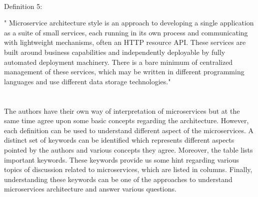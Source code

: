\\
\begin{shaded}Definition 5: \cite{Fowler:2014aa}\end{shaded}
" Microservice architecture style is an approach to developing a single application as a suite of small services, each running in its own process and communicating with lightweight mechanisms, often an HTTP resource API. These services are built around business capabilities and independently deployable by fully automated deployment machinery. There is a bare minimum of centralized management of these services, which may be written in different programming languages and use different data storage technologies."
\\
\\
\\
The authors have their own way of interpretation of microservices but at the same time agree upon some basic concepts regarding the architecture. However, each definition can be used to understand different aspect of the microservices. A distinct set of keywords can be identified which represents different aspects pointed by the authors and various concepts they agree. Moreover, the table lists important keywords. These keywords provide us some hint regarding various topics of discussion related to microservices, which are listed in columns. Finally, understanding these keywords can be one of the approaches to understand microservices architecture and answer various questions.


